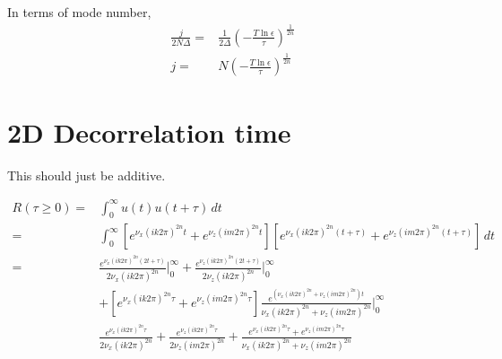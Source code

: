 \documentclass[11pt, oneside]{article}   	%
\begin{document}
In terms of mode number,
\begin{align}
\frac{j}{2 N \Delta} =& \frac{1}{2 \Delta} \left( -\frac{T \ln \epsilon}{ \tau} \right)^{\frac{1}{2n}} \\
j =&  N \left( -\frac{T \ln \epsilon}{ \tau} \right)^{\frac{1}{2n}}
\end{align}

%
\section{2D Decorrelation time}
%

This should just be additive. 

\begin{align}
R(\tau \geq 0) =& \int_0^\infty u(t)u(t+\tau) \, dt \\
=& \int_0^\infty \left[ e^{\nu_x (i k 2 \pi)^{2n} t} + e^{\nu_z (i m 2 \pi)^{2n} t} \right] \left[ e^{\nu_x (i k 2 \pi)^{2n} (t+\tau)} + e^{\nu_z (i m 2 \pi)^{2n} (t+\tau)} \right] \, dt \\
=& \frac{e^{ \nu_x (i k 2 \pi)^{2n} (2t + \tau)}}{2 \nu_x (i k 2 \pi)^{2n}} \biggr\rvert_0^\infty + \frac{e^{ \nu_z (i k 2 \pi)^{2n} (2t + \tau)}}{2 \nu_z (i k 2 \pi)^{2n}} \biggr\rvert_0^\infty \\
& + \left[ e^{\nu_x (i k 2 \pi)^{2n} \tau} + e^{\nu_z (i m 2 \pi)^{2n} \tau} \right] \frac{e^{ (\nu_x (i k 2 \pi)^{2n} + \nu_z (i m 2 \pi)^{2n}) t}}{\nu_x (i k 2 \pi)^{2n} + \nu_z (i m 2 \pi)^{2n}}\biggr\rvert_0^\infty \\
&\frac{e^{ \nu_x (i k 2 \pi)^{2n} \tau}}{2 \nu_x (i k 2 \pi)^{2n}}+ \frac{e^{ \nu_z (i k 2 \pi)^{2n} \tau}}{2 \nu_z (i m 2 \pi)^{2n}} + \frac{e^{\nu_x (i k 2 \pi)^{2n} \tau} + e^{\nu_z (i m 2 \pi)^{2n} \tau}}{ \nu_x (i k 2 \pi)^{2n} + \nu_z (i m 2 \pi)^{2n} }
\end{align}
\end{document}
